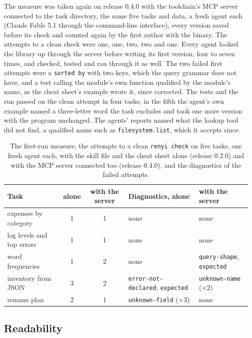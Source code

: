 \documentclass[11pt]{article}
\begin{document}
The measure was taken again on release 0.4.0 with the toolchain's MCP
server connected to the task directory, the same five tasks and data,
a fresh agent each (Claude Fable 5.1 through the command-line
interface), every version saved before its check and counted again by
the first author with the binary. The attempts to a clean check were
one, one, two, two and one. Every agent looked the library up through
the server before writing its first version, four to seven times, and
checked, tested and ran through it as well. The two failed first
attempts were a \texttt{sorted by} with two keys, which the query
grammar does not have, and a test calling the module's own function
qualified by the module's name, as the cheat sheet's example wrote it,
since corrected. The tests and the run passed on the clean attempt in
four tasks; in the fifth the agent's own example named a three-letter
word the task excludes and took one more version with the program
unchanged. The agents' reports named what the lookup tool did not
find, a qualified name such as \texttt{filesystem.list}, which it
accepts since.

\begin{table}[t]
\centering
\footnotesize
\setlength{\tabcolsep}{4pt}
\begin{tabular}{lccll}
\toprule
Task & alone & with the server & Diagnostics, alone & with the server \\
\midrule
expenses by category & 1 & 1 & none & none \\
log levels and top errors & 1 & 1 & none & none \\
word frequencies & 1 & 2 & none & \texttt{query-shape}, \texttt{expected} \\
inventory from JSON & 3 & 2 & \texttt{error-not-declared}; \texttt{expected} & \texttt{unknown-name} ($\times 2$) \\
rename plan & 2 & 1 & \texttt{unknown-field} ($\times 3$) & none \\
\bottomrule
\end{tabular}
\caption{The first-run measure, the attempts to a clean \texttt{renyi
check} on five tasks, one fresh agent each, with the skill file and
the cheat sheet alone (release 0.2.0) and with the MCP server
connected too (release 0.4.0), and the diagnostics of the failed
attempts.}
\label{tab:firstrun}
\end{table}

\subsection{Readability}
\label{sec:readability}
\end{document}
